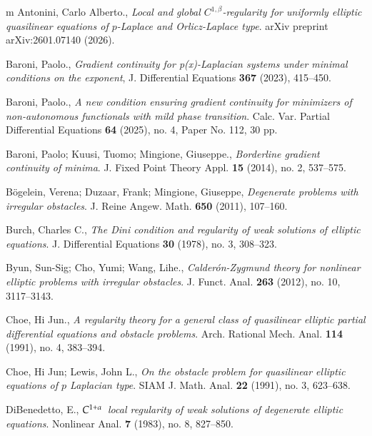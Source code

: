 \documentclass[reqno]{amsart}
\numberwithin{equation}{section}
\theoremstyle{plain}
\theoremstyle{definition}
\theoremstyle{remark}
\begin{document}
\begin{thebibliography}{m}
%  
Antonini, Carlo Alberto.,
{\it Local and global $ C^{1,\beta} $-regularity for uniformly elliptic quasilinear equations of $ p $-{L}aplace and {O}rlicz-{L}aplace type}. arXiv preprint arXiv:2601.07140 (2026).
 
 
  Baroni, Paolo.,
 {\it Gradient continuity for p(x)-Laplacian systems under minimal conditions on the exponent}, J. Differential Equations {\bf 367} (2023), 415--450.

  Baroni, Paolo., 
{\it A new condition ensuring gradient continuity for minimizers of non-autonomous functionals with mild phase transition}. Calc. Var. Partial Differential Equations {\bf 64} (2025), no. 4, Paper No. 112, 30 pp.
 
 
 Baroni, Paolo; Kuusi, Tuomo; Mingione, Giuseppe., 
{\it Borderline gradient continuity of minima}. J. Fixed Point Theory Appl. {\bf 15} (2014), no. 2, 537--575. 
 
%
B\"{o}gelein, Verena; Duzaar, Frank; Mingione, Giuseppe,
{\it Degenerate problems with irregular obstacles}. J. Reine Angew. Math. {\bf 650} (2011), 107--160.


%
Burch, Charles C.,
{\it The {D}ini condition and regularity of weak solutions of elliptic equations}.
J. Differential Equations {\bf 30} (1978), no. 3, 308--323.

%
Byun, Sun-Sig; Cho, Yumi; Wang, Lihe.,
{\it Calder\'on-{Z}ygmund theory for nonlinear elliptic problems with irregular obstacles}. 
J. Funct. Anal. {\bf 263} (2012), no. 10, 3117--3143.


Choe, Hi Jun., 
{\it A regularity theory for a general class of quasilinear elliptic partial differential equations and obstacle problems}.
Arch. Rational Mech. Anal. {\bf 114} (1991), no. 4, 383--394.


Choe, Hi Jun; Lewis, John L.,
{\it On the obstacle problem for quasilinear elliptic equations of $p$ Laplacian type}.
SIAM J. Math. Anal. {\bf 22} (1991), no. 3, 623--638.


DiBenedetto, E.,
{\it {$C\sp{1+\alpha }$}\ local regularity of weak solutions of degenerate elliptic equations}. 
Nonlinear Anal. {\bf 7} (1983), no. 8, 827--850.



\end{thebibliography}
\end{document}
